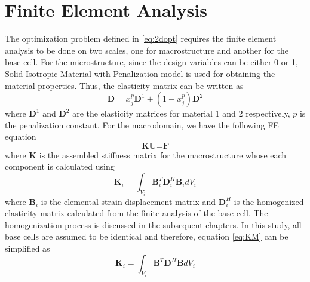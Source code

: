 \documentclass[openright,twoside]{iitkthesis}
\begin{document}
\section{Finite Element Analysis} 
The optimization problem defined in \eqref{eq:2dopt} requires the finite element analysis to be done on two scales, one for macrostructure and another for the base cell. For the microstructure, since the design variables can be either 0 or 1, Solid Isotropic Material with Penalization model\cite{bendsoe1999material} is used for obtaining the material properties. Thus, the elasticity matrix can be written as
\begin{equation}
\label{eq:simp}
\textbf{D} = x_j^p\textbf{D}^1 + (1-x_j^p)\textbf{D}^2
\end{equation}
where $\textbf{D}^1$ and $\textbf{D}^2$ are the elasticity matrices for material 1 and 2 respectively, $p$ is the penalization constant.
For the macrodomain, we have the following FE equation
\begin{equation}
\textbf{KU} = \textbf{F}
\end{equation}
where $\textbf{K}$ is the assembled stiffness matrix for the macrostructure whose each component is calculated using
\begin{equation}
\label{eq:KM}
\textbf{K}_i =  \int_{V_i} \textbf{B}_i^T\textbf{D}_i^H\textbf{B}_i dV_i
\end{equation} 
where $\textbf{B}_i$ is the elemental strain-displacement matrix and $\textbf{D}_i^H$ is the homogenized elasticity matrix calculated from the finite analysis of the base cell. The homogenization process\cite{bendsoe1988generating} is discussed in the subsequent chapters. In this study, all base cells are assumed to be identical and therefore, equation \eqref{eq:KM} can be simplified as
\begin{equation}
\label{eq:KM1}
\textbf{K}_i =  \int_{V_i} \textbf{B}^T\textbf{D}^H\textbf{B} dV_i
\end{equation} 
\end{document}
